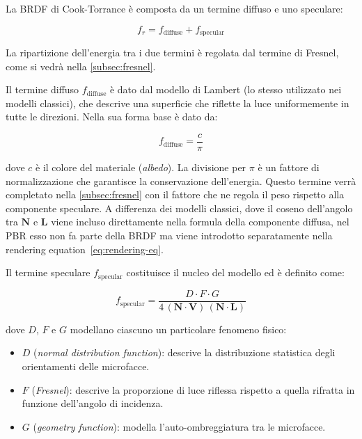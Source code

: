 \documentclass[12pt,a4paper,twoside]{book}
\begin{document}
La BRDF di Cook-Torrance è composta da un termine diffuso e uno speculare:

\begin{equation}
    f_r = f_{\text{diffuse}} + f_{\text{specular}}
    \label{eq:brdf-decomposizione}
\end{equation}

La ripartizione dell'energia tra i due termini è regolata dal termine di Fresnel, come si vedrà nella \cref{subsec:fresnel}.

Il termine diffuso $f_{\text{diffuse}}$ è dato dal modello di Lambert (lo stesso utilizzato nei modelli classici), che descrive una superficie che riflette la luce uniformemente in tutte le direzioni. Nella sua forma base è dato da:

\begin{equation}
    f_{\text{diffuse}} = \frac{c}{\pi}
    \label{eq:lambert-pbr}
\end{equation}

dove $c$ è il colore del materiale (\textit{albedo}). La divisione per $\pi$ è un fattore di normalizzazione che garantisce la conservazione dell'energia. Questo termine verrà completato nella \cref{subsec:fresnel} con il fattore che ne regola il peso rispetto alla componente speculare. A differenza dei modelli classici, dove il coseno dell'angolo tra $\mathbf{N}$ e $\mathbf{L}$ viene incluso direttamente nella formula della componente diffusa, nel PBR esso non fa parte della BRDF ma viene introdotto separatamente nella rendering equation~\eqref{eq:rendering-eq}.

Il termine speculare $f_{\text{specular}}$ costituisce il nucleo del modello ed è definito come:

\begin{equation}
    f_{\text{specular}} = \frac{D \cdot F \cdot G}
    {4 \, (\mathbf{N} \cdot \mathbf{V}) \, (\mathbf{N} \cdot \mathbf{L})}
    \label{eq:cook-torrance}
\end{equation}

dove $D$, $F$ e $G$ modellano ciascuno un particolare fenomeno fisico:

\begin{itemize}
    \item $D$ (\textit{normal distribution function}): descrive la distribuzione statistica degli orientamenti delle microfacce.
    \item $F$ (\textit{Fresnel}): descrive la proporzione di luce riflessa rispetto a quella rifratta in funzione dell'angolo di incidenza.
    \item $G$ (\textit{geometry function}): modella l'auto-ombreggiatura tra le microfacce.
\end{itemize}
\end{document}
